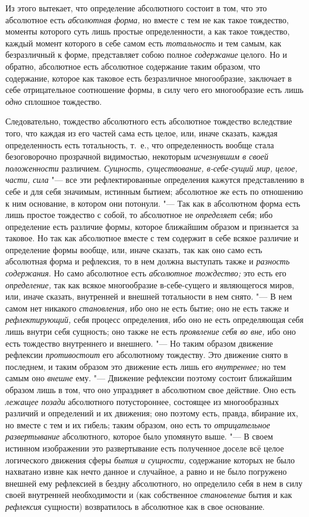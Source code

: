 Из этого вытекает, что определение абсолютного состоит в том, что это
абсолютное есть {\em абсолютная форма,} но вместе с тем
не как такое тождество, моменты которого суть лишь простые определенности,
а как такое тождество, каждый момент которого в себе самом есть
{\em тотальность} и тем самым, как безразличный к
форме, представляет собою полное {\em содержание}
целого. Но и обратно, абсолютное есть абсолютное содержание таким образом,
что содержание, которое как таковое есть безразличное многообразие,
заключает в себе отрицательное соотношение формы, в силу чего его
многообразие есть лишь {\em одно} сплошное тождество.

Следовательно, тождество абсолютного есть абсолютное тождество вследствие
того, что каждая из его частей сама есть целое, или, иначе сказать, каждая
определенность есть тотальность, т.~е., что определенность вообще стала
безоговорочно прозрачной видимостью, некоторым
{\em исчезнувшим в своей положенности} различием.
{\em Сущность, существование, в-себе-сущий мир, целое,
части, сила} "--- все эти рефлектированные определения кажутся представлению в
себе и для себя значимым, истинным бытием; абсолютное же есть по отношению
к ним основание, в котором они потонули. "--- Так как в абсолютном форма есть
лишь простое тождество с собой, то абсолютное не
{\em определяет} себя; ибо определение есть различие
формы, которое ближайшим образом и признается за таковое. Но так как
абсолютное вместе с тем содержит в себе всякое различие и определение формы
вообще, или, иначе сказать, так как оно само есть абсолютная форма и
рефлексия, то в нем должна выступать также и
{\em разность содержания}. Но само абсолютное есть
{\em абсолютное тождество;} это есть его
{\em определение,} так как всякое многообразие
в-себе-сущего и являющегося миров, или, иначе сказать, внутренней и внешней
тотальности в нем снято. "--- В нем самом нет никакого
{\em становления,} ибо оно не есть бытие; оно не есть
также и {\em рефлектирующий,} себя процесс определения,
ибо оно не есть определяющая себя лишь внутри себя сущность; оно также не
есть {\em проявление себя во вне,} ибо оно есть
тождество внутреннего и внешнего. "--- Но таким образом движение рефлексии
{\em противостоит} его абсолютному тождеству. Это
движение снято в последнем, и таким образом это движение есть лишь его
{\em внутреннее;} но тем самым оно
{\em внешне} ему. "--- Движение рефлексии поэтому состоит
ближайшим образом лишь в том, что оно упраздняет в абсолютном свое
действие. Оно есть {\em лежащее позади} абсолютного
потустороннее, состоящее из многообразных различий и определений и их
движения; оно поэтому есть, правда, вбирание их, но вместе с тем и их
гибель; таким образом, оно есть то {\em отрицательное
развертывание} абсолютного, которое было упомянуто выше. "--- В своем истинном
изображении это развертывание есть полученное доселе всё целое логического
движения сферы {\em бытия и сущности,} содержание
которых не было нахватано извне как нечто данное и случайное, а равно и не
было погружено внешней ему рефлексией в бездну абсолютного, но определило
себя в нем в силу своей внутренней необходимости и (как собственное
{\em становление} бытия и как
{\em рефлексия} сущности) возвратилось в абсолютное как
в свое основание.

